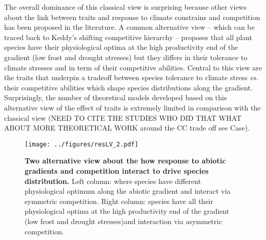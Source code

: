 \documentclass[a4paper,11pt]{article}
\begin{document}
The overall dominance of this classical view is surprising because other views about the link between traits and response to climate constrains and competition has been proposed in the literature. A common alternative view -- which can be traced back to Keddy's shifting competitive hierarchy \citep{Keddy-1989}-- proposes that all plant species have their physiological optima at the high productivity end of the gradient (low frost and drought stresses) but they differs in their tolerance to climate stresses and in term of their competitive abilities\citep{Keddy-1989}. Central to this view are the traits that underpin a tradeoff between species tolerance to climate stress \textit{vs.} their competitive abilities which shape species distributions along the gradient. Surprisingly, the number of theoretical models developed based on this alternative view of the effect of traits is extremely limited in comparison with the classical view (NEED TO CITE THE STUDIES WHO DID THAT \citep{Smith-1989,Leinard-2016} WHAT ABOUT MORE THEORETICAL WORK around the CC trade off see Case).

\begin{figure}[ht]
\centering
\texttt{[image: ../figures/resLV\_2.pdf]}
\caption{\textbf{Two alternative view about the how response to abiotic gradients and competition interact to drive species distribution.} Left column: where species have different physiological optimum along the abiotic gradient and interact via symmetric competition. Right column:  species have all their physiological optima at the high productivity end of the gradient (low frost and drought stresses)and interaction via asymmetric competition.
\label{fig:theointro}}
\end{figure}
\end{document}
